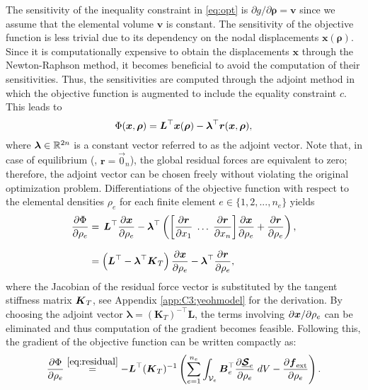 The sensitivity of the inequality constraint in \eqref{eq:opt} is ${\partial g}/{\partial \boldsymbol{\rho}} = \boldsymbol{v}$ since we assume that the elemental volume $\boldsymbol{v}$ is constant. The sensitivity of the objective function is less trivial due to its dependency on the nodal displacements $\boldsymbol{x}(\boldsymbol{\rho})$. Since it is computationally expensive to obtain the displacements $\boldsymbol{x}$ through the Newton-Raphson method, it becomes beneficial to avoid the computation of their sensitivities. Thus, the sensitivities are computed through the adjoint method in which the objective function is augmented to include the equality constraint $c$. This leads to
%
\begin{equation}
{\Phi}({\boldsymbol{x}},\boldsymbol{\rho}) = \boldsymbol{L}^\top \boldsymbol{x}(\boldsymbol{\rho}) - \boldsymbol{\lambda}^\top \boldsymbol{r}({\boldsymbol{x}},\boldsymbol{\rho}),
\end{equation}
%
where $\boldsymbol{\lambda} \in \mathbb{R}^{2n}$ is a constant vector referred to as the adjoint vector. Note that, in case of equilibrium (\ie, $\boldsymbol{r} = \vec{0}_n$), the global residual forces are equivalent to zero; therefore, the adjoint vector can be chosen freely without violating the original optimization problem. 
Differentiations of the objective function with respect to the elemental densities $\rho_e$ for each finite element $e \in \{1,2,...,n_e\}$ yields
%
\begin{align}
\frac{\partial \Phi}{\partial {\rho_e}} & = \,\boldsymbol{L}^\top \frac{\partial {\boldsymbol{x}}}{\partial \rho_e} - \boldsymbol{\lambda}^\top\left( \left[ \frac{\partial {\boldsymbol{r}}}{\partial x_1} \;\hdots\; \frac{\partial {\boldsymbol{r}}}{\partial x_n} \right] \!\frac{\partial {\boldsymbol{x}}}{\partial \rho_e} + \frac{\partial \boldsymbol{r}}{ \partial \rho_e} \right), \notag \\[0.75em]
 & = \left(\boldsymbol{L}^\top - \boldsymbol{\lambda}^\top \boldsymbol{K}_T \right) \frac{\partial \boldsymbol{x}}{\partial \rho_e} - \boldsymbol{\lambda}^\top \frac{\partial \boldsymbol{r}}{\partial \rho_e},  \label{eq:sen_deriv} 
\end{align}
%
\noindent where the Jacobian of the residual force vector is substituted by the tangent stiffness matrix ${\boldsymbol{K}}_T$, see Appendix \ref{app:C3:yeohmodel} for the derivation. By choosing the adjoint vector $\boldsymbol{\lambda} = (\boldsymbol{K}_T)^{-\top}\boldsymbol{L}$, the terms involving ${\partial {\boldsymbol{x}}}/{\partial \rho_e}$ can be eliminated and thus computation of the gradient becomes feasible. Following this, the gradient of the objective function can be written compactly as:
%
\begin{align}
\frac{\partial {\Phi} }{\partial \rho_e} \overset{\eqref{eq:residual}}{=} -\boldsymbol{L}^\top(\boldsymbol{K}_T)^{-1} \left( \sum_{e=1}^{n_e} \int_{\mathcal{V}_e} \boldsymbol{B}_e^\top \frac{\partial \underline{{\boldsymbol{\mathcal{S}}}}_e}{\partial {\rho_e}} \; dV - \frac{ \partial {\boldsymbol{f}}_{\textrm{ext}}}{\partial {\rho_e}}  \right). \label{eq:sens_f}
\end{align} 
%

